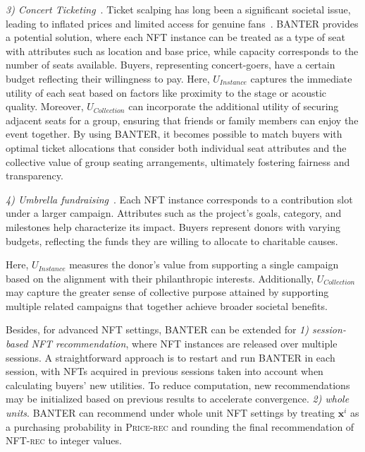\documentclass[conference]{IEEEtran}
\newcommand{\1}[1]{\mathds{1}\left[#1\right]}
\theoremstyle{plain}
\newcommand{\method}{\textsf{BANTER}\xspace}
\newcommand{\finddemand}{\textsc{NFT-rec}\xspace}
\newcommand{\findprice}{\textsc{Price-rec}\xspace}
\begin{document}
{    \textit{3) Concert Ticketing}~\cite{sastiono2016studies, stein2014will}. Ticket scalping has long been a significant societal issue, leading to inflated prices and limited access for genuine fans~\cite{stein2014will}. \method provides a potential solution, where each NFT instance can be treated as a type of seat with attributes such as location and base price, while capacity corresponds to the number of seats available. Buyers, representing concert-goers, have a certain budget reflecting their willingness to pay. Here, $U_{\textit{Instance}}$ captures the immediate utility of each seat based on factors like proximity to the stage or acoustic quality. Moreover, $U_{\textit{Collection}}$ can incorporate the additional utility of securing adjacent seats for a group, ensuring that friends or family members can enjoy the event together. By using \method, it becomes possible to match buyers with optimal ticket allocations that consider both individual seat attributes and the collective value of group seating arrangements, ultimately fostering fairness and transparency.

    \textit{4) Umbrella fundraising}~\cite{eckel2020independent, li2016social}. Each NFT instance corresponds to a contribution slot under a larger campaign. Attributes such as the project’s goals, category, and milestones help characterize its impact. Buyers represent donors with varying budgets, reflecting the funds they are willing to allocate to charitable causes. 

    Here, $U_{\textit{Instance}}$ measures the donor’s value from supporting a single campaign based on the alignment with their philanthropic interests. Additionally, $U_{\textit{Collection}}$ may capture the greater sense of collective purpose attained by supporting multiple related campaigns that together achieve broader societal benefits.

    Besides, for advanced NFT settings, \method can be extended for \textit{1) session-based NFT recommendation}, where NFT instances are released over multiple sessions. A straightforward approach is to restart and run \method in each session, with NFTs acquired in previous sessions taken into account when calculating buyers' new utilities. To reduce computation, new recommendations may be initialized based on previous results to accelerate convergence. \textit{2) whole units}. \method can recommend under whole unit NFT settings by treating $\mathbf{x}^i$ as a purchasing probability in \findprice and rounding the final recommendation of \finddemand to integer values.

}
\end{document}
